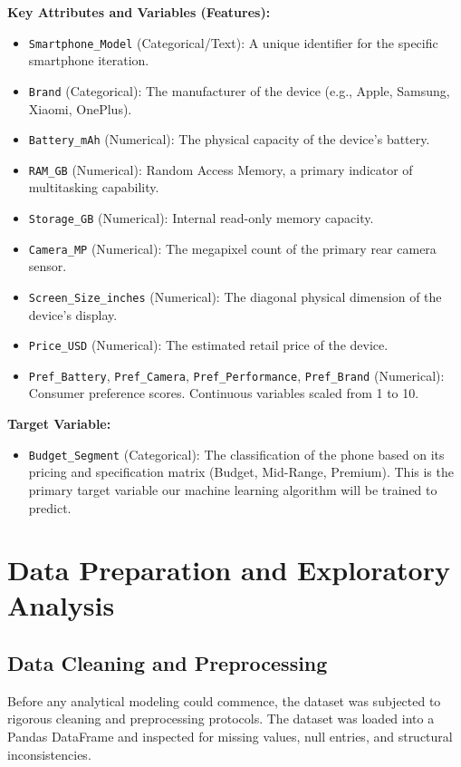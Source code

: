 \documentclass[12pt,a4paper]{article}
\begin{document}
\textbf{Key Attributes and Variables (Features):}
\begin{itemize}
    \item \texttt{Smartphone\_Model} (Categorical/Text): A unique identifier for the specific smartphone iteration.
    \item \texttt{Brand} (Categorical): The manufacturer of the device (e.g., Apple, Samsung, Xiaomi, OnePlus).
    \item \texttt{Battery\_mAh} (Numerical): The physical capacity of the device's battery.
    \item \texttt{RAM\_GB} (Numerical): Random Access Memory, a primary indicator of multitasking capability.
    \item \texttt{Storage\_GB} (Numerical): Internal read-only memory capacity.
    \item \texttt{Camera\_MP} (Numerical): The megapixel count of the primary rear camera sensor.
    \item \texttt{Screen\_Size\_inches} (Numerical): The diagonal physical dimension of the device's display.
    \item \texttt{Price\_USD} (Numerical): The estimated retail price of the device.
    \item \texttt{Pref\_Battery}, \texttt{Pref\_Camera}, \texttt{Pref\_Performance}, \texttt{Pref\_Brand} (Numerical): Consumer preference scores. Continuous variables scaled from 1 to 10.
\end{itemize}

\textbf{Target Variable:}
\begin{itemize}
    \item \texttt{Budget\_Segment} (Categorical): The classification of the phone based on its pricing and specification matrix (Budget, Mid-Range, Premium). This is the primary target variable our machine learning algorithm will be trained to predict.
\end{itemize}

\newpage
\section{Data Preparation and Exploratory Analysis}

\subsection{Data Cleaning and Preprocessing}
Before any analytical modeling could commence, the dataset was subjected to rigorous cleaning and preprocessing protocols. The dataset was loaded into a Pandas DataFrame and inspected for missing values, null entries, and structural inconsistencies. 
\end{document}
